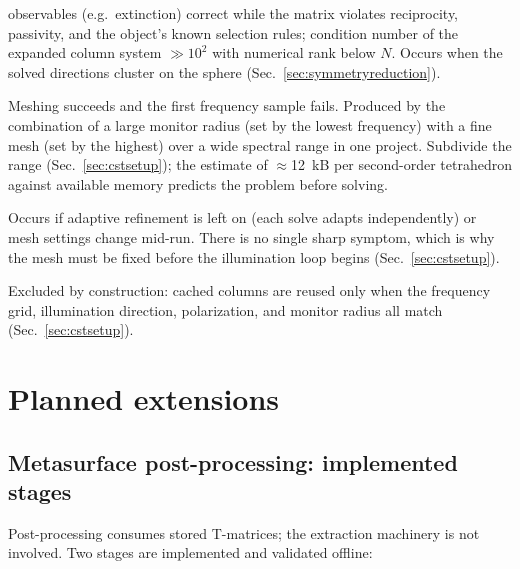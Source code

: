 \documentclass[11pt]{article}
\begin{document}
\begin{description}
observables (e.g.\ extinction) correct while the matrix violates
reciprocity, passivity, and the object's known selection rules;
condition number of the expanded column system $\gg 10^2$ with
numerical rank below $N$.  Occurs when the solved directions cluster
on the sphere (Sec.~\ref{sec:symmetryreduction}).
\item[Insufficient memory (``Could not compute preconditioner'').]
Meshing succeeds and the first frequency sample fails.  Produced by
the combination of a large monitor radius (set by the lowest
frequency) with a fine mesh (set by the highest) over a wide spectral
range in one project.  Subdivide the range (Sec.~\ref{sec:cstsetup}); the estimate of
$\approx$12~kB per second-order tetrahedron against available memory
predicts the problem before solving.
\item[Columns computed on different meshes.]  Occurs if adaptive
refinement is left on (each solve adapts independently) or mesh
settings change mid-run.  There is no single sharp symptom, which is
why the mesh must be fixed before the illumination loop begins
(Sec.~\ref{sec:cstsetup}).
\item[Reuse of cached columns from a different configuration.]
Excluded by construction: cached columns are reused only when the
frequency grid, illumination direction, polarization, and monitor
radius all match (Sec.~\ref{sec:cstsetup}).
\end{description}

\section{Planned extensions}
\label{sec:planned}

\subsection{Metasurface post-processing: implemented stages}
\label{sec:metasurfacepost}
Post-processing consumes stored T-matrices; the extraction machinery is
not involved.  Two stages are implemented and validated offline:
\end{document}
